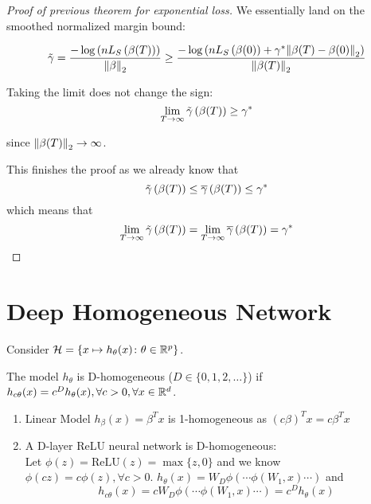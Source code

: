 \begin{proof}[Proof of previous theorem for exponential loss]
    We essentially land on the smoothed normalized margin bound: 

    \[
        \tilde{\gamma} = \frac{ - \log \left(n L_S \left(\beta(T)\right)  \right) }{\norm{\beta}_2} \geq \frac{- \log \left( n L_S \left( \beta(0) \right) + \gamma^* \norm{\beta(T) - \beta(0)}_2 \right)}{\norm{\beta(T)}_2}
    \]

    Taking the limit does not change the sign: 
    \[
        \lim_{T \to \infty} \tilde{\gamma} \left( \beta (T)\right) \geq \gamma^* 
    \]



    since \(\norm{\beta(T)}_2 \to \infty\). 


    This finishes the proof as we already know that 
    \[
        \tilde{\gamma} \left( \beta (T)\right) \leq \overline{\gamma} \left(\beta(T)\right) \leq \gamma^* 
    \]
    which means that 
    \[
        \lim_{T \to \infty} \tilde{\gamma} \left( \beta(T)\right) = \lim_{T \to \infty} \overline{\gamma} \left( \beta(T)\right) = \gamma^* 
    \]
\end{proof}


\section{Deep Homogeneous Network}

Consider \(\mathcal{H} = \{  x \mapsto h_\theta (x) \colon \theta \in \mathbb{R}^p \}\). 

\begin{definition}
    The model \(h_\theta\) is D-homogeneous (\(D \in \{ 0, 1, 2, \ldots \}\)) if 
    \(h_{c\theta} (x) = c^D h_\theta (x), \forall c > 0, \forall x \in \mathbb{R}^d\). 
\end{definition}

\begin{eg}
    \begin{enumerate}
        \item Linear Model \(h_\beta (x) = \beta^T x\) is 1-homogeneous as \((c\beta)^T x = c \beta^T x\)
        \item A D-layer ReLU neural network is D-homogeneous: \\
        Let \(\phi(z) = \text{ReLU}(z) = \max \{z, 0\}\) and we know \(\phi(cz) = c \phi(z), \forall c > 0\). 
        \( h_\theta (x) = W_D \phi \left( \cdots \phi (W_1, x) \cdots \right) \) and 
        \[
            h_{c\theta} (x) = c W_D \phi \left(  \cdots \phi (W_1, x) \cdots  \right) = c^D h_\theta (x)  
        \]
    \end{enumerate}
\end{eg}


